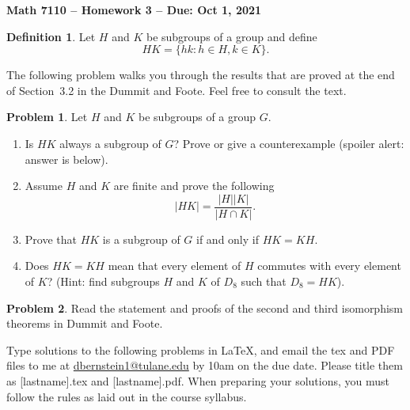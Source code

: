 \documentclass[letterpaper,11pt]{amsart}
\theoremstyle{plain}
\theoremstyle{definition}
\newtheorem*{defn*}{Definition}
\newtheorem{pr}{Problem}
\theoremstyle{remark}
\begin{document}
\Large

\begin{center}
{\bf Math 7110 -- Homework  3 --  Due:  Oct 1, 2021}
\end{center}

\normalsize


\medskip


\begin{defn*}
    Let $H$ and $K$ be subgroups of a group and define
    \[
        HK = \{hk: h \in H, k \in K\}.
    \]
\end{defn*}

The following problem walks you through the results that are proved at the end of Section~3.2 in the Dummit and Foote. Feel free to consult the text.

\begin{pr}
    Let $H$ and $K$ be subgroups of a group $G$.
    \begin{enumerate}
        \item Is $HK$ always a subgroup of $G$? Prove or give a counterexample (spoiler alert: answer is below).
        \item Assume $H$ and $K$ are finite and prove the following
        \[
            |HK| = \frac{|H||K|}{|H\cap K|}.
        \]
        \item Prove that $HK$ is a subgroup of $G$ if and only if $HK = KH$.
        \item Does $HK = KH$ mean that every element of $H$ commutes with every element of $K$? (Hint: find subgroups $H$ and $K$ of $D_8$ such that $D_8 = HK$).
    \end{enumerate}
\end{pr}

\begin{pr}
     Read the statement and proofs of the second and third isomorphism theorems in Dummit and Foote.
\end{pr}

\bigskip

Type solutions to the following problems in \LaTeX, and email the tex and PDF files to me at \url{dbernstein1@tulane.edu} by 10am on the due date.
Please title them as [lastname].tex and [lastname].pdf.
When preparing your solutions, you must follow the rules as laid out in the course syllabus.

\vspace{.5cm}

\end{document}
